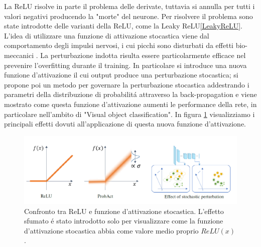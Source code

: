 \documentclass[a4paper,10pt]{article}
\begin{document}
 La ReLU risolve in parte il problema delle derivate, tuttavia si annulla per tutti i valori negativi producendo la "morte" del neurone. Per risolvere il problema sono state introdotte delle varianti della ReLU, come la Leaky ReLU\ref{LeakyReLU}. 
 L'idea di utilizzare una funzione di attivazione stocastica viene dal comportamento degli impulsi nervosi, i cui picchi sono disturbati da effetti bio-meccanici \cite{lewicki1998review}. La perturbazione indotta risulta essere particolarmente efficace nel prevenire l'overfitting durante il training. In particolare si introduce una nuova funzione d'attivazione il cui output produce una perturbazione stocastica; si propone poi un metodo per governare la perturbazione stocastica addestrando i parametri della distribuzione di probabilit\'a attraverso la back-propagation e viene mostrato come questa funzione d'attivazione aumenti le performance della rete, in particolare nell'ambito di "Visual object classification". 
 In figura \ref{ProbActEffectpng} visualizziamo i principali effetti dovuti all'applicazione di questa nuova funzione d'attivazione. 
 \begin{figure}[h!]
  \centering
  \includegraphics[scale=0.4]{ProbActEffect.png} 
  \caption{Confronto tra ReLU e funzione d'attivazione stocastica. L'effetto sfumato \'e stato introdotto solo per visualizzare come la funzione d'attivazione stocastica abbia come valore medio proprio $ReLU(x)$.}
  \label{ProbActEffectpng}
 \end{figure}
 
\end{document}

